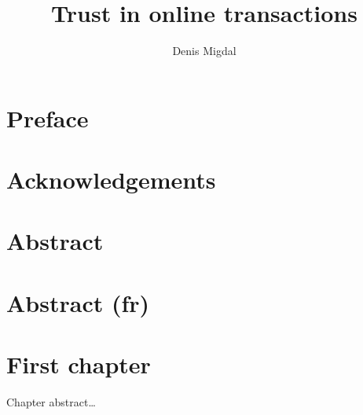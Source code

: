\documentclass{style/thesis}
\title{Trust in online transactions}
\author{Denis Migdal}
\begin{document}
\chapter*{Preface}

\chapter*{Acknowledgements}


\chapter*{Abstract}

\chapter*{Abstract (fr)}

\toc




\chapter{First chapter}
    \begin{chapterabstract}
       Chapter abstract…
    \end{chapterabstract}
    \chaptertoc
    
    
\end{document}
